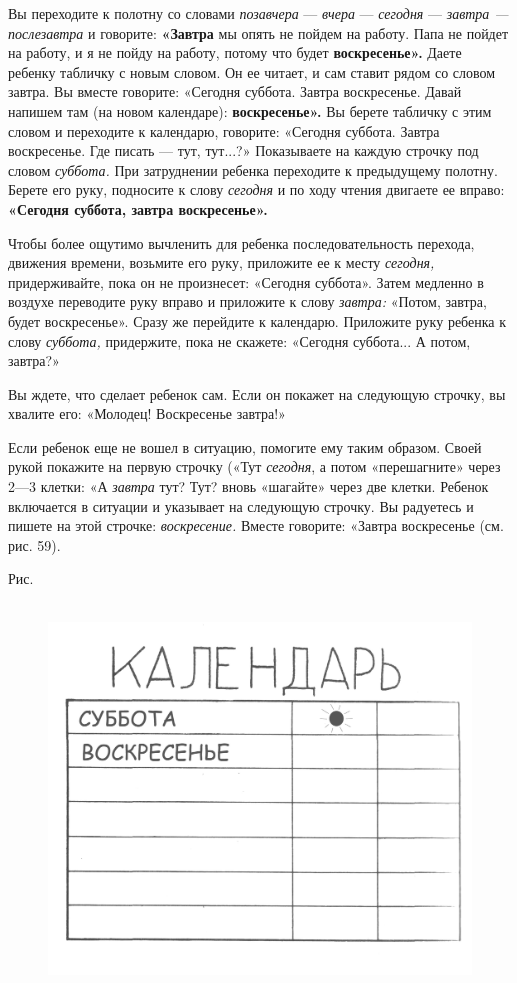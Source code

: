 \documentclass[a5paper]{book}
\renewcommand{\emph}[1]{\textit{#1}}
\begin{document}
Вы переходите к полотну со словами \emph{позавчера} --- \emph{вчера} ---
\emph{сегодня} --- \emph{завтра --- послезавтра} и говорите:
\textbf{«Завтра} мы опять не пойдем на работу. Папа не пойдет на работу,
и я не пойду на работу, потому что будет \textbf{воскресенье».} Даете
ребенку табличку с новым словом. Он ее читает, и сам ставит рядом со
словом завтра. Вы вместе говорите: «Сегодня суббота. Завтра воскресенье.
Давай напишем там (на новом календаре): \textbf{воскресенье».} Вы берете
табличку с этим словом и переходите к календарю, говорите: «Сегодня
суббота. Завтра воскресенье. Где писать --- тут, тут...?» Показываете на
каждую строчку под словом \emph{суббота.} При затруднении ребенка
переходите к предыдущему полотну. Берете его руку, подносите к слову
\emph{сегодня} и по ходу чтения двигаете ее вправо: \textbf{«Сегодня
суббота, завтра воскресенье».}

Чтобы более ощутимо вычленить для ребенка последовательность перехода,
движения времени, возьмите его руку, приложите ее к месту
\emph{сегодня,} придерживайте, пока он не произнесет: «Сегодня суббота».
Затем медленно в воздухе переводите руку вправо и приложите к слову
\emph{завтра:} «Потом, завтра, будет воскресенье». Сразу же перейдите к
календарю. Приложите руку ребенка к слову \emph{суббота,} придержите,
пока не скажете: «Сегодня суббота... А потом, завтра?»

Вы ждете, что сделает ребенок сам. Если он покажет на следующую строчку,
вы хвалите его: «Молодец! Воскресенье завтра!»

Если ребенок еще не вошел в ситуацию, помогите ему таким образом. Своей
рукой покажите на первую строчку («Тут \emph{сегодня}, а потом
«перешагните» через 2---3 клетки: «А \emph{завтра} тут? Тут? вновь
«шагайте» через две клетки. Ребенок включается в ситуации и указывает на
следующую строчку. Вы радуетесь и пишете на этой строчке:
\emph{воскресение.} Вместе говорите: «Завтра воскресенье (см. рис. 59).

Рис.
\begin{figure}
\includegraphics[width=4.9029in,height=4.07083in]{media/media/image56.jpg}
\end{figure}
\end{document}
